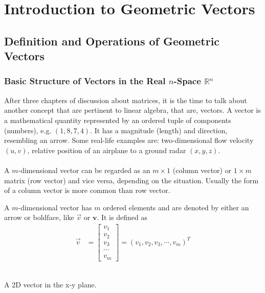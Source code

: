\chapter{Introduction to Geometric Vectors}
\section{Definition and Operations of Geometric Vectors}

\subsection{Basic Structure of Vectors in the Real $n$-Space $\mathbb{R}^n$}
After three chapters of discussion about matrices, it is the time to talk about another concept that are pertinent to linear algebra, that are, vectors. A vector is a mathematical quantity represented by an ordered tuple of components (numbers), e.g. $(1, 8, 7, 4)$. It has a magnitude (length) and direction, resembling an arrow. Some real-life examples are: two-dimensional flow velocity $(u, v)$, relative position of an airplane to a ground radar $(x, y, z)$.\\
\\
A $m$-dimensional vector can be regarded as an $m \times 1$ (column vector) or $1 \times m$ matrix (row vector) and vice versa, depending on the situation. Usually the form of a column vector is more common than row vector.
\begin{defn}
A $m$-dimensional vector has $m$ ordered elements and are denoted by either an arrow or boldface, like $\vec{v}$ or $\textbf{v}$. It is defined as
\begin{align*}
\vec{v} &=
\begin{bmatrix}
v_1 \\
v_2 \\
v_3 \\
\cdots \\
v_m
\end{bmatrix}
=
(v_1, v_2, v_3, \cdots, v_m)^T
\end{align*}
\end{defn}
\begin{center}
\\
A 2D vector in the x-y plane.
\end{center}
